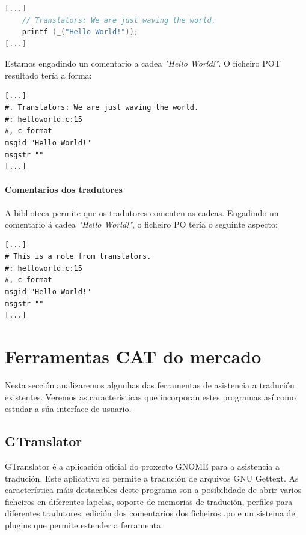 \begin{lstlisting}[language=C,caption=Tradución con comentario.]
[...]
    // Translators: We are just waving the world.
    printf (_("Hello World!"));
[...]
\end{lstlisting}

Estamos engadindo un comentario a cadea \emph{"Hello World!"}. O ficheiro POT resultado tería a forma:

\begin{lstlisting}[label=some-code,caption=Ficheiro POT con comentario.]
[...]
#. Translators: We are just waving the world.
#: helloworld.c:15
#, c-format
msgid "Hello World!"
msgstr ""
[...]
\end{lstlisting}


\paragraph{Comentarios dos tradutores}
A biblioteca permite que os tradutores comenten as cadeas. Engadindo un comentario á cadea \emph{"Hello World!"}, o ficheiro PO tería o seguinte aspecto:

\begin{lstlisting}[caption=Ficheiro PO con comentario.]
[...]
# This is a note from translators.
#: helloworld.c:15
#, c-format
msgid "Hello World!"
msgstr ""
[...]
\end{lstlisting}

\section{Ferramentas CAT do mercado}
\label{sec:ferramentascat}
Nesta sección analizaremos algunhas das ferramentas de asistencia a tradución existentes. Veremos as características que incorporan estes programas así como estudar a súa interface de usuario.

\subsection{GTranslator}
GTranslator é a aplicación oficial do proxecto GNOME para a asistencia a tradución. Este aplicativo so permite a tradución de arquivos GNU Gettext. As característica máis destacables deste programa son a posibilidade de abrir varios ficheiros en diferentes lapelas, soporte de memorias de tradución, perfiles para diferentes tradutores, edición dos comentarios dos ficheiros .po e un sistema de plugins que permite estender a ferramenta.

